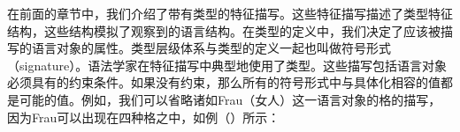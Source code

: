 在前面的章节中，我们介绍了带有类型的特征描写。这些特征描写描述了类型特征结构，这些结构模拟了观察到的语言结构。在类型的定义中，我们决定了应该被描写的语言对象的属性。类型层级体系与类型的定义一起也叫做符号形式（signature）。语法学家在特征描写中典型地使用了类型。这些描写包括语言对象必须具有的约束条件。如果没有约束，那么所有的符号形式中与具体化相容的值都是可能的值。例如，我们可以省略诸如Frau（女人）这一语言对象的格的描写，因为Frau可以出现在四种格之中，如例（）所示：

